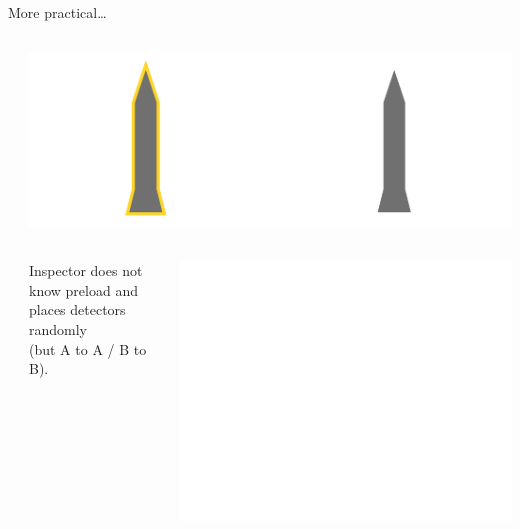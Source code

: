 \documentclass[presentation]{beamer}
\begin{document}
\begin{frame}[label=sec-5-5]{More practical\ldots{}}
\begin{columns}
\begin{column}{0.48\textwidth}
\begin{columns}
\begin{column}{0.48\textwidth}
\pause
\end{column}
\end{columns}
\end{column}

\begin{column}{0.48\textwidth}

\includegraphics[width=\textwidth]{images/zkp/measurement_step2.pdf}
\vspace{1cm}

\begin{columns}
\begin{column}{0.48\textwidth}

\fontsize{8pt}{9.6}\selectfont

Inspector does not know preload and places detectors randomly \\ (but A to A / B to B). 

\normalsize
\end{column}

\begin{column}{0.48\textwidth}

\includegraphics[width=\textwidth]{images/zkp/measurement_detectors_inspector.pdf}
\end{column}
\end{columns}
\end{column}
\end{columns}
\end{frame}
\end{document}
